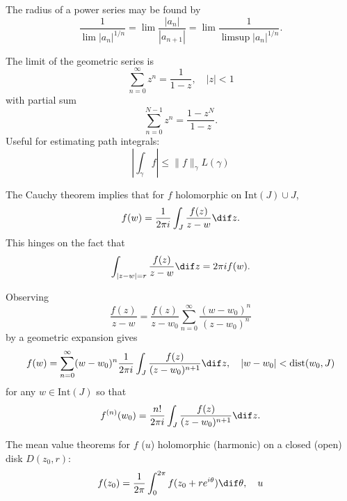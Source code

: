 \documentclass[8pt]{article}
\begin{document}
The radius of a power series may be found by
$$
  \frac{1}{\lim |a_n|^{1/n}}
= \lim \frac{|a_n|}{|a_{n+1}|}
= \lim \frac{1}{\limsup |a_n|^{1 / n}}.
$$

The limit of the geometric series is
$$
\sum_{n=0}^\infty z^n = \frac{1}{1 - z}, \quad |z| < 1
$$
with partial sum
$$
\sum_{n=0}^{N-1} z^n = \frac{1 - z^N}{1 - z}.
$$
Useful for estimating path integrals:
$$
\left|
  \int_\gamma f
\right|
\leq
\| f \|_\gamma L(\gamma)
$$

The Cauchy theorem implies that
for $f$ holomorphic on $\mathrm{Int}(J) \cup J$,
$$
  f(w)
= \frac{1}{2 \pi i}
  \int_J
    \frac{f(z)}{z - w}
    \dif z.
$$
This hinges on the fact that
$$
\int_{|z - w| = r}
  \frac{f(z)}
       {z - w}
  \dif z
= 2 \pi i f(w).
$$

Observing
$$
  \frac{f(z)}{z - w}
= \frac{f(z)}{z - w_0}
  \sum_{n=0}^\infty
    \frac{(w - w_0)^n}
         {(z - w_0)^n}
$$
by a geometric expansion gives
$$
  f(w)
= \sum_{n=0}^\infty
    (w - w_0)^n
    \frac{1}{2 \pi i}
    \int_J
      \frac{f(z)}{(z - w_0)^{n+1}}
      \dif z, \quad
  |w - w_0| < \mathrm{dist}(w_0, J)
$$
for any $w \in \mathrm{Int}(J)$
so that
$$
  f^{(n)}(w_0)
= \frac{n!}{2 \pi i}
  \int_J
    \frac{f(z)}{(z - w_0)^{n+1}}
    \dif z.
$$

The mean value theorems for $f$ ($u$) holomorphic (harmonic)
on a closed (open) disk $D(z_0, r)$:
$$
  f(z_0)
= \frac{1}{2 \pi}
  \int_0^{2 \pi}
    f(z_0 + re^{i\theta})
    \dif \theta, \quad
u
$$
\end{document}
